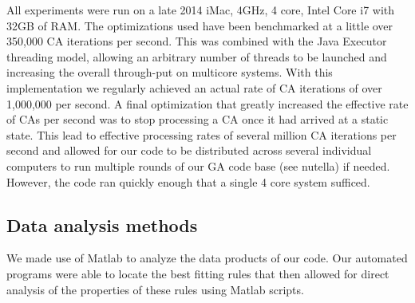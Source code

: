 All experiments were run on a late 2014 iMac, 4GHz, 4 core, Intel Core i7 with 32GB of RAM. The optimizations used have been benchmarked at a little over 350,000 CA iterations per second. This was combined with the Java Executor threading model, allowing an arbitrary number of threads to be launched and increasing the overall through-put on multicore systems. With this implementation we regularly achieved an actual rate of CA iterations of over 1,000,000 per second. A final optimization that greatly increased the effective rate of CAs per second was to stop processing a CA once it had arrived at a static state. This lead to effective processing rates of several million CA iterations per second and allowed for our code to be distributed across several individual computers to run multiple rounds of our GA code base (see nutella) if needed. However, the code ran quickly enough that a single 4 core system sufficed.

\subsection{Data analysis methods}

We made use of Matlab to analyze the data products of our code. Our automated programs were able to locate the best fitting rules that then allowed for direct analysis of the properties of these rules using Matlab scripts. 

